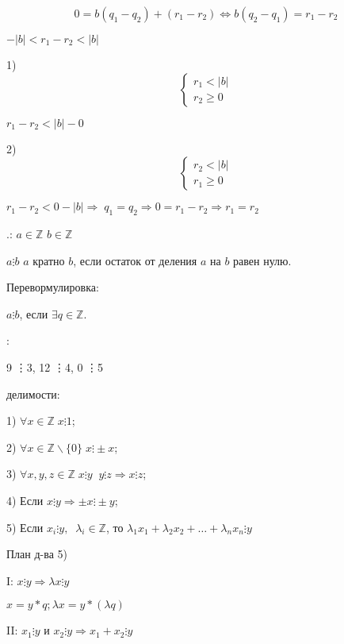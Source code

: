 \documentclass{article}
\begin{document}
\[0 = b(q_1 - q_2) + (r_1 - r_2) \Leftrightarrow b(q_2 - q_1) = r_1 - r_2\]

$-|b| < r_1 - r_2 < |b|$

1)
\begin{equation*}
 \begin{cases}
   r_1 < |b|
   \\
   r_2 \geq 0 
 \end{cases}
\end{equation*}

$r_1 - r_2 < |b| - 0$

2)
\begin{equation*}
 \begin{cases}
   r_2 < |b| 
   \\
   r_1 \geq 0 
 \end{cases}
\end{equation*}

$r_1 - r_2 < 0 - |b| \Rightarrow\; q_1 = q_2 \Rightarrow 0 = r_1 - r_2 \Rightarrow r_1 = r_2$

.: $a \in \mathbb{Z}$  $b\in \mathbb{Z}$

$a \vdots b$ \Russian $a$ кратно $b$, если остаток от деления $a$ на $b$ равен нулю.

\noindent Перевормулировка:

$a \vdots b$, если $\exists q \in \mathbb{Z}$.

:

9 \vdots 3, \hspace{10pt} 12 \vdots 4, \hspace{10pt} 0 \vdots 5

 делимости:

1) $\forall x \in \mathbb{Z}\; x\vdots 1$;

2) $\forall x \in \mathbb{Z} \backslash \{0\} \; x\vdots \pm x$;

3) $\forall x, y, z \in \mathbb{Z} \; x\vdots y \; \; y\vdots z \Rightarrow x\vdots z$;

4) Если $x \vdots y \Rightarrow \pm x \vdots \pm y$;

5) Если $x_i \vdots y, \;\; \lambda_i \in \mathbb{Z}$, \Russian то \;
$\lambda_1x_1 +\lambda_2x_2 + \dotsc + \lambda_nx_n \vdots y$

План д-ва 5)

I: $x\vdots y \Rightarrow \lambda x\vdots y$

$x = y *q; \lambda x = y * (\lambda q)$

II: $x_1\vdots y$ \Russian и $x_2\vdots y \Rightarrow x_1 + x_2 \vdots y$
\end{document}
